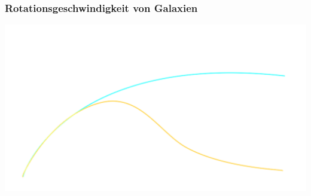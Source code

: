 \documentclass[14pt]{beamer}
\begin{document}
\begin{frame}
	\frametitle{Rotationsgeschwindigkeit von Galaxien}
	\begin{center}
		\includegraphics[height=0.4\textheight]{dark_matter.png}
		
		
	\end{center}
\end{frame}
\end{document}
